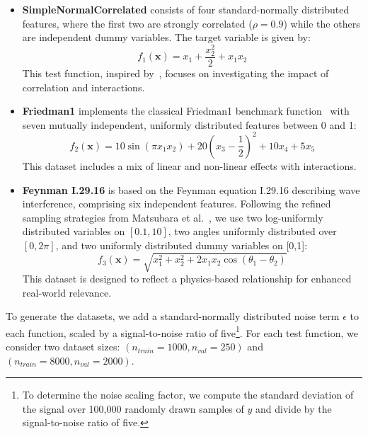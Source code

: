 \documentclass[runningheads]{llncs}
\begin{document}
\begin{itemize}[label=--]
    \item \textbf{SimpleNormalCorrelated} consists of four
          standard-normally distributed features, where the first two
          are strongly correlated ($\rho = 0.9$) while the others are
          independent dummy variables. The target variable is given by:
          \begin{equation}
              f_1(\boldsymbol{x}) = x_1 + \frac{x_2^2}{2} + x_1 x_2
          \end{equation}
          This test function, inspired by~\cite{liu_model_2018}, focuses
          on investigating the impact of correlation and interactions.
    \item \textbf{Friedman1} implements the classical Friedman1 benchmark
          function~\cite{breiman_bagging_1996,friedman_multivariate_1991}
          with seven mutually independent, uniformly distributed features
          between 0 and 1:
          \begin{equation}
              f_2(\boldsymbol{x}) = 10 \sin(\pi x_1 x_2) + 20{(x_3 - \frac{1}{2})}^2 + 10 x_4 + 5 x_5
          \end{equation}
          This dataset includes a mix of linear and non-linear effects with
          interactions.
    \item \textbf{Feynman I.29.16} is based on the Feynman equation I.29.16
          describing wave interference, comprising six independent features. Following
          the refined sampling strategies from Matsubara et al.~\cite{matsubara_rethinking_2024},
          we use two log-uniformly distributed variables on $[0.1, 10]$, two angles uniformly
          distributed over $[0, 2\pi]$, and two uniformly distributed dummy variables on [0,1]:
          \begin{equation}
              f_3(\boldsymbol{x}) = \sqrt{x_1^2 + x_2^2 + 2 x_1 x_2 \cos(\theta_1 - \theta_2)}
          \end{equation}
          This dataset is designed to reflect a physics-based relationship for enhanced real-world relevance.

\end{itemize}

\noindent To generate the datasets, we add a standard-normally distributed noise term $\epsilon$ to each function,
scaled by a signal-to-noise ratio of five\footnote{To determine the noise scaling factor,
    we compute the standard deviation of the signal over 100,000 randomly drawn samples of $y$ and
    divide by the signal-to-noise ratio of five.}. For each test function, we consider two dataset sizes:
$(n_{train}=1000, n_{val}=250)$ and $(n_{train}=8000, n_{val}=2000)$.
\end{document}
